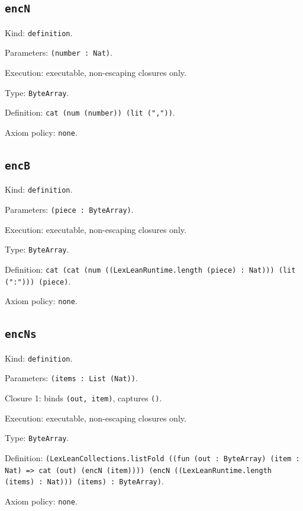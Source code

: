 \documentclass[11pt]{article}
\begin{document}
\subsection*{\texttt{encN}}
\noindent Kind: \texttt{definition}.\par
\noindent Parameters: \texttt{(number : Nat)}.\par
\noindent Execution: executable, non-escaping closures only.\par
\noindent Type: \texttt{ByteArray}.\par
\noindent Definition: \texttt{cat (num (number)) (lit (","))}.\par
\noindent Axiom policy: \texttt{none}.\par
\subsection*{\texttt{encB}}
\noindent Kind: \texttt{definition}.\par
\noindent Parameters: \texttt{(piece : ByteArray)}.\par
\noindent Execution: executable, non-escaping closures only.\par
\noindent Type: \texttt{ByteArray}.\par
\noindent Definition: \texttt{cat (cat (num ((LexLeanRuntime.length (piece) : Nat))) (lit (":"))) (piece)}.\par
\noindent Axiom policy: \texttt{none}.\par
\subsection*{\texttt{encNs}}
\noindent Kind: \texttt{definition}.\par
\noindent Parameters: \texttt{(items : List (Nat))}.\par
\noindent Closure 1: binds \texttt{(out, item)}, captures \texttt{()}.\par
\noindent Execution: executable, non-escaping closures only.\par
\noindent Type: \texttt{ByteArray}.\par
\noindent Definition: \texttt{(LexLeanCollections.listFold ((fun (out : ByteArray) (item : Nat) => cat (out) (encN (item)))) (encN ((LexLeanRuntime.length (items) : Nat))) (items) : ByteArray)}.\par
\noindent Axiom policy: \texttt{none}.\par
\end{document}
